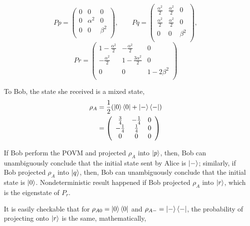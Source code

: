 \documentclass[%
 reprint,
superscriptaddress,
 amsmath,amssymb,
 aps,
]{revtex4-2}
\begin{document}
\begin{equation}
    Pp=\left(
\begin{array}{ccc}
 0 & 0 & 0 \\
 0 & \alpha^2 & 0 \\
 0 & 0 & \beta^2 \\
\end{array}
\right), \qquad
Pq=\left(
\begin{array}{ccc}
 \frac{\alpha^2}{2} & \frac{\alpha^2}{2}
   & 0 \\
 \frac{\alpha^2}{2} & \frac{\alpha^2}{2}
   & 0 \\
 0 & 0 & \beta^2 \\
\end{array}
\right),
\end{equation}
\begin{equation}
Pr=\left(
\begin{array}{ccc}
 1-\frac{\alpha^2}{2} &
   -\frac{\alpha^2}{2} & 0 \\
 -\frac{\alpha^2}{2} & 1-\frac{3
   \alpha^2}{2} & 0 \\
 0 & 0 & 1-2 \beta^2 \\
\end{array}
\right)
\end{equation}

To Bob, the state she received is a mixed state,
\begin{equation}
\begin{split}
    \rho_A &= \frac{1}{2}(\ket{0}\bra{0}+\ket{-}\bra{-})\\
    &=\left(
\begin{array}{ccc}
 \frac{3}{4} & -\frac{1}{4} &
   0 \\
 -\frac{1}{4} & \frac{1}{4} &
   0 \\
 0 & 0 & 0 \\
\end{array}
\right)
\end{split}
\end{equation}

If Bob perform the POVM and projected $\rho_A$ into $\ket{p}$, then, Bob can unambiguously conclude that the initial state sent by Alice is $\ket{-}$; similarly, if Bob projected $\rho_A$ into $\ket{q}$, then, Bob can unambiguously conclude that the initial state is $\ket{0}$. Nondeterministic result happened if Bob projected $\rho_A$ into $\ket{r}$, which is the eigenstate of $P_r$.

It is easily checkable that for $\rho_{A0}=\ket{0}\bra{0}$ and $\rho_{A-}=\ket{-}\bra{-}$, the probability of projecting onto $\ket{r}$ is the same, mathematically,
\end{document}
